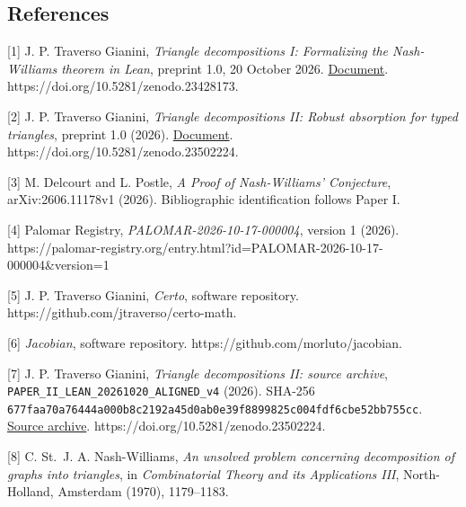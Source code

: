 \documentclass[english,11pt,a4paper]{article}
\begin{document}
\noindent\begin{minipage}{\linewidth}
\subsection{References}\label{references}

\begingroup\small\raggedright
\setlength{\parskip}{3pt}

{[}1{]} J. P. Traverso Gianini, \emph{Triangle decompositions I: Formalizing the Nash-Williams theorem in Lean}, preprint 1.0, 20 October 2026. \href{https://github.com/jtraverso/nash-williams-triangle-decompositions-release/blob/main/preprints/PAPER_I/01_manuscript/PAPER_I_preprint_v1.0_en.md}{Document}. https://doi.org/10.5281/zenodo.23428173.

{[}2{]} J. P. Traverso Gianini, \emph{Triangle decompositions II: Robust absorption for typed triangles}, preprint 1.0 (2026). \href{https://github.com/jtraverso/nash-williams-triangle-decompositions-release/blob/main/preprints/PAPER_II/01_manuscript/PAPER_II_preprint_v1.0_en.md}{Document}. https://doi.org/10.5281/zenodo.23502224.

{[}3{]} M. Delcourt and L. Postle, \emph{A Proof of Nash-Williams' Conjecture}, arXiv:2606.11178v1 (2026). Bibliographic identification follows Paper I.

{[}4{]} Palomar Registry, \emph{PALOMAR-2026-10-17-000004}, version 1 (2026). https://palomar-registry.org/entry.html?id=PALOMAR-2026-10-17-000004\&version=1

{[}5{]} J. P. Traverso Gianini, \emph{Certo}, software repository. https://github.com/jtraverso/certo-math.

{[}6{]} \emph{Jacobian}, software repository. https://github.com/morluto/jacobian.

{[}7{]} J. P. Traverso Gianini, \emph{Triangle decompositions II: source archive}, \texttt{PAPER\_\allowbreak{}II\_\allowbreak{}LEAN\_\allowbreak{}20261020\_\allowbreak{}ALIGNED\_\allowbreak{}v4} (2026). SHA-256 \texttt{677faa70\allowbreak{}a76444a0\allowbreak{}00b8c219\allowbreak{}2a45d0ab\allowbreak{}0e39f889\allowbreak{}9825c004\allowbreak{}fdf6cbe5\allowbreak{}2bb755cc}. \href{https://github.com/jtraverso/nash-williams-triangle-decompositions-release/blob/d6d020982ebf3f3cd8c104b6befc6c094850b3e7/archives/PAPER_II_LEAN_20261020_ALIGNED_v4.zip}{Source archive}. https://doi.org/10.5281/zenodo.23502224.

{[}8{]} C. St.~J. A. Nash-Williams, \emph{An unsolved problem concerning decomposition of graphs into triangles}, in \emph{Combinatorial Theory and its Applications III}, North-Holland, Amsterdam (1970), 1179--1183.


\end{minipage}
\end{document}

